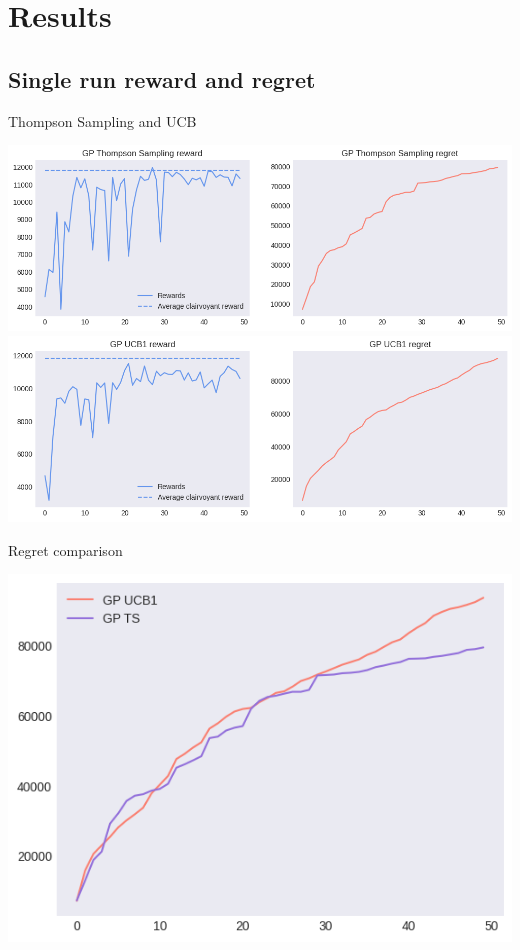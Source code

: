 \section{Results}

\subsection{Single run reward and regret}

Thompson Sampling and UCB

\begin{center}
	\includegraphics[scale=0.4]{img/Graphs/uncertain_alpha_unit/image1.png}
	\includegraphics[scale=0.4]{img/Graphs/uncertain_alpha_unit/image2.png}
\end{center}

Regret comparison

\begin{center}
	\includegraphics[scale=0.5]{img/Graphs/uncertain_alpha_unit/image3.png}
\end{center}

